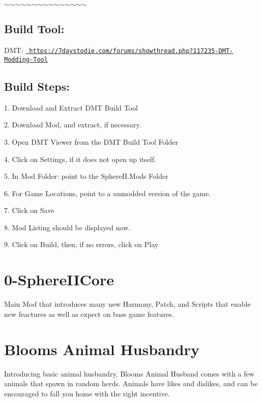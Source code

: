 $\sim$$\sim$$\sim$$\sim$$\sim$$\sim$$\sim$$\sim$$\sim$$\sim$$\sim$$\sim$$\sim$$\sim$$\sim$\hypertarget{index_autotoc_md11}{}\subsection{Build Tool\+:}\label{index_autotoc_md11}
D\+MT\+: \href{https://7daystodie.com/forums/showthread.php?117235-DMT-Modding-Tool}{\texttt{ https\+://7daystodie.\+com/forums/showthread.\+php?117235-\/\+D\+M\+T-\/\+Modding-\/\+Tool}}\hypertarget{index_autotoc_md12}{}\subsection{Build Steps\+:}\label{index_autotoc_md12}
\begin{DoxyVerb}1. Download and Extract DMT Build Tool

2. Download Mod, and extract, if necessary.

3. Open DMT Viewer from the DMT Build Tool Folder

4. Click on Settings, if it does not open up itself.

5. In Mod Folder:  point to the SphereII.Mods Folder

6. For Game Locations, point to a unmodded version of the game.

7. Click on Save

8. Mod Listing should be displayed now. 

9. Click on Build, then, if no errors, click on Play
\end{DoxyVerb}








 \hypertarget{index_autotoc_md14}{}\section{0-\/\+Sphere\+I\+I\+Core}\label{index_autotoc_md14}
Main Mod that introduces many new Harmony, Patch, and Scripts that enable new feactures as well as expect on base game features.



 \hypertarget{index_autotoc_md16}{}\section{Bloom\textquotesingle{}s Animal Husbandry}\label{index_autotoc_md16}
Introducing basic animal husbandry, Bloom\textquotesingle{}s Animal Husband comes with a few animals that spawn in random herds. Animals have likes and dislikes, and can be encouraged to fall you home with the right incentive.



